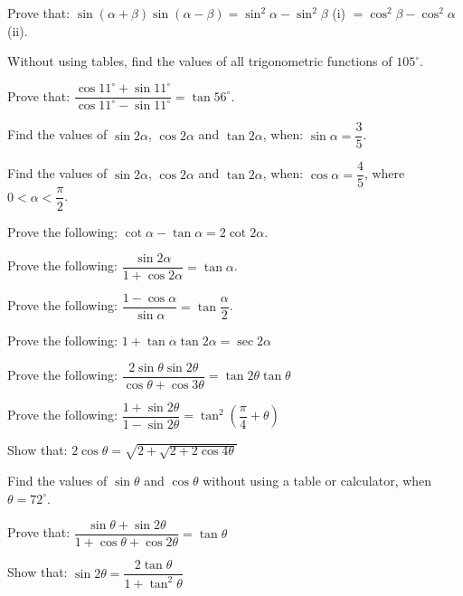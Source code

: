 \documentclass[11pt,a4paper]{article}
\begin{document}
\begin{shortlist}
\item Prove that: $\sin(\alpha+\beta)\sin(\alpha-\beta)=\sin^2\alpha-\sin^2\beta$ (i) $=\cos^2\beta-\cos^2\alpha$ (ii).

\item Without using tables, find the values of all trigonometric functions of $105^\circ$.

\item Prove that: $\dfrac{\cos 11^\circ+\sin 11^\circ}{\cos 11^\circ-\sin 11^\circ}=\tan 56^\circ$.

\item Find the values of $\sin 2\alpha$, $\cos 2\alpha$ and $\tan 2\alpha$, when: $\sin\alpha=\dfrac{3}{5}$.

\item Find the values of $\sin 2\alpha$, $\cos 2\alpha$ and $\tan 2\alpha$, when: $\cos\alpha=\dfrac{4}{5}$, where $0<\alpha<\dfrac{\pi}{2}$.

\item Prove the following: $\cot\alpha-\tan\alpha=2\cot 2\alpha$.

\item Prove the following: $\dfrac{\sin 2\alpha}{1+\cos 2\alpha}=\tan\alpha$.

\item Prove the following: $\dfrac{1-\cos\alpha}{\sin\alpha}=\tan\dfrac{\alpha}{2}$.

\item Prove the following: $1+\tan\alpha\tan2\alpha = \sec2\alpha$

\item Prove the following: $\dfrac{2\sin\theta\sin2\theta}{\cos\theta+\cos3\theta} = \tan2\theta\tan\theta$

\item Prove the following: $\dfrac{1+\sin2\theta}{1-\sin2\theta} = \tan^2\left(\dfrac{\pi}{4}+\theta\right)$

\item Show that: $2\cos\theta = \sqrt{2+\sqrt{2+2\cos4\theta}}$

\item Find the values of $\sin\theta$ and $\cos\theta$ without using a table or calculator, when $\theta = 72^{\circ}$.

\item Prove that: $\dfrac{\sin\theta+\sin2\theta}{1+\cos\theta+\cos2\theta} = \tan\theta$

\item Show that: $\sin2\theta = \dfrac{2\tan\theta}{1+\tan^2\theta}$


\end{shortlist}
\end{document}
